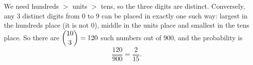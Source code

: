 We need hundreds $>$ units $>$ tens, so the three digits are distinct. Conversely, any $3$ distinct digits from $0$ to $9$ can be placed in exactly one such way: largest in the hundreds place (it is not $0$), middle in the units place and smallest in the tens place. So there are $\dbinom{10}{3}=120$ such numbers out of $900$, and the probability is
\[\dfrac{120}{900}=\boxed{\dfrac{2}{15}}.\]

